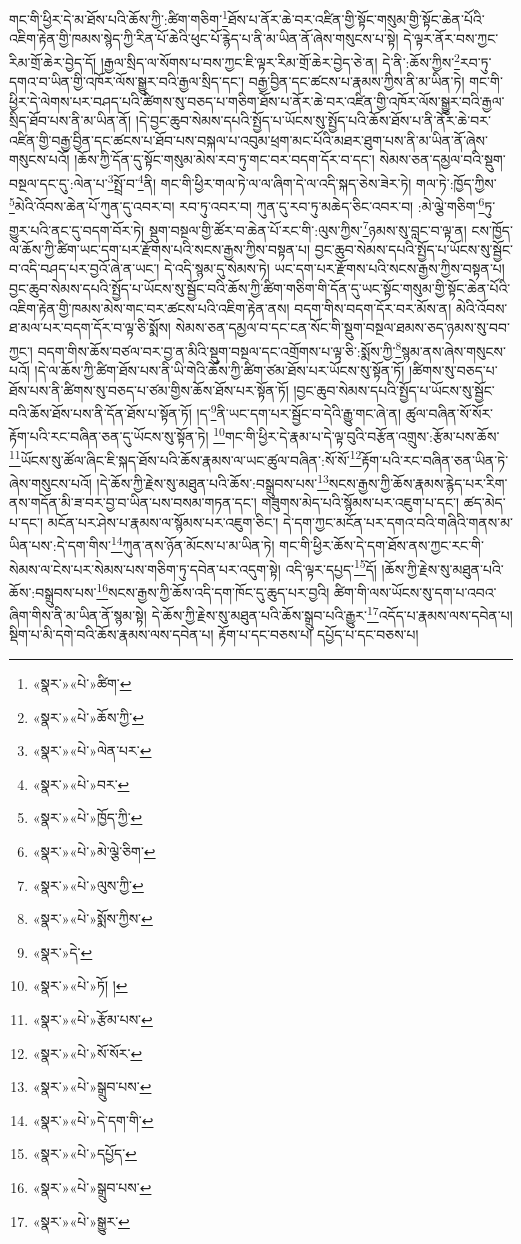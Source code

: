 གང་གི་ཕྱིར་དེ་མ་ཐོས་པའི་ཆོས་ཀྱི་:ཚིག་གཅིག་\footnote{«སྣར་»«པེ་»ཚིག་}ཐོས་པ་ནོར་ཆེ་བར་འཛིན་གྱི་སྟོང་གསུམ་གྱི་སྟོང་ཆེན་པོའི་འཇིག་རྟེན་གྱི་ཁམས་སྙེད་ཀྱི་རིན་པོ་ཆེའི་ཕུང་པོ་རྙེད་པ་ནི་མ་ཡིན་ནོ་ཞེས་གསུངས་པ་སྟེ། དེ་ལྟར་ནོར་བས་ཀྱང་རིམ་གྲོ་ཆེར་བྱེད་དོ། །རྒྱལ་སྲིད་ལ་སོགས་པ་བས་ཀྱང་ཇི་ལྟར་རིམ་གྲོ་ཆེར་བྱེད་ཅེ་ན། དེ་ནི་:ཆོས་ཀྱིས་\footnote{«སྣར་»«པེ་»ཆོས་ཀྱི་}རབ་ཏུ་དགའ་བ་ཡིན་གྱི་འཁོར་ལོས་སྒྱུར་བའི་རྒྱལ་སྲིད་དང་། བརྒྱ་བྱིན་དང་ཚངས་པ་རྣམས་ཀྱིས་ནི་མ་ཡིན་ཏེ། གང་གི་ཕྱིར་དེ་ལེགས་པར་བཤད་པའི་ཚིགས་སུ་བཅད་པ་གཅིག་ཐོས་པ་ནོར་ཆེ་བར་འཛིན་གྱི་འཁོར་ལོས་སྒྱུར་བའི་རྒྱལ་སྲིད་ཐོབ་པས་ནི་མ་ཡིན་ནོ། །དེ་བྱང་ཆུབ་སེམས་དཔའི་སྤྱོད་པ་ཡོངས་སུ་སྤྱོད་པའི་ཆོས་ཐོས་པ་ནི་ནོར་ཆེ་བར་འཛིན་གྱི་བརྒྱ་བྱིན་དང་ཚངས་པ་ཐོབ་པས་བསྐལ་པ་འབུམ་ཕྲག་མང་པོའི་མཐར་ཐུག་པས་ནི་མ་ཡིན་ནོ་ཞེས་གསུངས་པའོ། །ཆོས་ཀྱི་དོན་དུ་སྟོང་གསུམ་མེས་རབ་ཏུ་གང་བར་བདག་དོར་བ་དང་། སེམས་ཅན་དམྱལ་བའི་སྡུག་བསྔལ་དང་དུ་:ལེན་པ་\footnote{«སྣར་»«པེ་»ལེན་པར་}སྤྲོ་བ་\footnote{«སྣར་»«པེ་»བར་}ནི། གང་གི་ཕྱིར་གལ་ཏེ་ལ་ལ་ཞིག་དེ་ལ་འདི་སྐད་ཅེས་ཟེར་ཏེ། གལ་ཏེ་:ཁྱོད་ཀྱིས་\footnote{«སྣར་»«པེ་»ཁྱོད་ཀྱི་}མེའི་འོབས་ཆེན་པོ་ཀུན་དུ་འབར་བ། རབ་ཏུ་འབར་བ། ཀུན་དུ་རབ་ཏུ་མཆེད་ཅིང་འབར་བ། :མེ་ལྕེ་གཅིག་\footnote{«སྣར་»«པེ་»མེ་ལྕེ་ཅིག་}ཏུ་གྱུར་པའི་ནང་དུ་བདག་བོར་ཏེ། སྡུག་བསྔལ་གྱི་ཚོར་བ་ཆེན་པོ་རང་གི་:ལུས་ཀྱིས་\footnote{«སྣར་»«པེ་»ལུས་ཀྱི་}ཉམས་སུ་བླང་བ་ལྟ་ན། ངས་ཁྱོད་ལ་ཆོས་ཀྱི་ཚིག་ཡང་དག་པར་རྫོགས་པའི་སངས་རྒྱས་ཀྱིས་བསྟན་པ། བྱང་ཆུབ་སེམས་དཔའི་སྤྱོད་པ་ཡོངས་སུ་སྦྱོང་བ་འདི་བཤད་པར་བྱའོ་ཞེ་ན་ཡང་། དེ་འདི་སྙམ་དུ་སེམས་ཏེ། ཡང་དག་པར་རྫོགས་པའི་སངས་རྒྱས་ཀྱིས་བསྟན་པ། བྱང་ཆུབ་སེམས་དཔའི་སྤྱོད་པ་ཡོངས་སུ་སྦྱོང་བའི་ཆོས་ཀྱི་ཚིག་གཅིག་གི་དོན་དུ་ཡང་སྟོང་གསུམ་གྱི་སྟོང་ཆེན་པོའི་འཇིག་རྟེན་གྱི་ཁམས་མེས་གང་བར་ཚངས་པའི་འཇིག་རྟེན་ནས། བདག་གིས་བདག་དོར་བར་མོས་ན། མེའི་འོབས་ཐ་མལ་པར་བདག་དོར་བ་ལྟ་ཅི་སྨོས། སེམས་ཅན་དམྱལ་བ་དང་ངན་སོང་གི་སྡུག་བསྔལ་ཐམས་ཅད་ཉམས་སུ་བབ་ཀྱང་། བདག་གིས་ཆོས་བཙལ་བར་བྱ་ན་མིའི་སྡུག་བསྔལ་དང་འགྲོགས་པ་ལྟ་ཅི་:སྨོས་ཀྱི་\footnote{«སྣར་»«པེ་»སྨོས་ཀྱིས་}སྙམ་ནས་ཞེས་གསུངས་པའོ། །དེ་ལ་ཆོས་ཀྱི་ཚིག་ཐོས་པས་ནི་ཡི་གེའི་ཆོས་ཀྱི་ཚིག་ཙམ་ཐོས་པར་ཡོངས་སུ་སྟོན་ཏོ། །ཚིགས་སུ་བཅད་པ་ཐོས་པས་ནི་ཚིགས་སུ་བཅད་པ་ཙམ་གྱིས་ཆོས་ཐོས་པར་སྟོན་ཏོ། །བྱང་ཆུབ་སེམས་དཔའི་སྤྱོད་པ་ཡོངས་སུ་སྦྱོང་བའི་ཆོས་ཐོས་པས་ནི་དོན་ཐོས་པ་སྟོན་ཏོ། །ད་\footnote{«སྣར་»དེ་}ནི་ཡང་དག་པར་སྦྱོང་བ་དེའི་རྒྱུ་གང་ཞེ་ན། ཚུལ་བཞིན་སོ་སོར་རྟོག་པའི་རང་བཞིན་ཅན་དུ་ཡོངས་སུ་སྟོན་ཏེ། \footnote{«སྣར་»«པེ་»ཏོ། ། }གང་གི་ཕྱིར་དེ་རྣམ་པ་དེ་ལྟ་བུའི་བརྩོན་འགྲུས་:རྩོམ་པས་ཆོས་\footnote{«སྣར་»«པེ་»རྩོམ་པས་}ཡོངས་སུ་ཚོལ་ཞིང་ཇི་སྐད་ཐོས་པའི་ཆོས་རྣམས་ལ་ཡང་ཚུལ་བཞིན་:སོ་སོ་\footnote{«སྣར་»«པེ་»སོ་སོར་}རྟོག་པའི་རང་བཞིན་ཅན་ཡིན་ཏེ་ཞེས་གསུངས་པའོ། །དེ་ཆོས་ཀྱི་རྗེས་སུ་མཐུན་པའི་ཆོས་:བསྒྲུབས་པས་\footnote{«སྣར་»«པེ་»སྒྲུབ་པས་}སངས་རྒྱས་ཀྱི་ཆོས་རྣམས་རྙེད་པར་རིག་ནས་གདོན་མི་ཟ་བར་བྱ་བ་ཡིན་པས་བསམ་གཏན་དང་། གཟུགས་མེད་པའི་སྙོམས་པར་འཇུག་པ་དང་། ཚད་མེད་པ་དང་། མངོན་པར་ཤེས་པ་རྣམས་ལ་སྙོམས་པར་འཇུག་ཅིང་། དེ་དག་ཀྱང་མངོན་པར་དགའ་བའི་གཞིའི་གནས་མ་ཡིན་པས་:དེ་དག་གིས་\footnote{«སྣར་»«པེ་»དེ་དག་གི་}ཀུན་ནས་ཉོན་མོངས་པ་མ་ཡིན་ཏེ། གང་གི་ཕྱིར་ཆོས་དེ་དག་ཐོས་ནས་ཀྱང་རང་གི་སེམས་ལ་ངེས་པར་སེམས་པས་གཅིག་ཏུ་དབེན་པར་འདུག་སྟེ། འདི་ལྟར་དཔྱད་\footnote{«སྣར་»«པེ་»དཔྱོད་}དོ། །ཆོས་ཀྱི་རྗེས་སུ་མཐུན་པའི་ཆོས་:བསྒྲུབས་པས་\footnote{«སྣར་»«པེ་»སྒྲུབ་པས་}སངས་རྒྱས་ཀྱི་ཆོས་འདི་དག་ཁོང་དུ་ཆུད་པར་བྱའི། ཚིག་གི་ལས་ཡོངས་སུ་དག་པ་འབའ་ཞིག་གིས་ནི་མ་ཡིན་ནོ་སྙམ་སྟེ། དེ་ཆོས་ཀྱི་རྗེས་སུ་མཐུན་པའི་ཆོས་སྒྲུབ་པའི་རྒྱུར་\footnote{«སྣར་»«པེ་»སྒྱུར་}འདོད་པ་རྣམས་ལས་དབེན་པ། སྡིག་པ་མི་དགེ་བའི་ཆོས་རྣམས་ལས་དབེན་པ། རྟོག་པ་དང་བཅས་པ། དཔྱོད་པ་དང་བཅས་པ། 